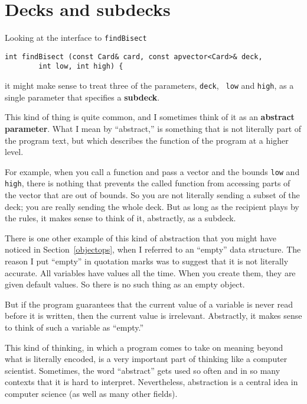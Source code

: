 
\section{Decks and subdecks}

Looking at the interface to {\tt findBisect}

\begin{verbatim}
int findBisect (const Card& card, const apvector<Card>& deck,
		int low, int high) {
\end{verbatim}
%
it might make sense to treat three of the parameters, {\tt deck}, {\tt
low} and {\tt high}, as a single parameter that specifies a {\bf
subdeck}.


This kind of thing is quite common, and I sometimes think of it as an
{\bf abstract parameter}.  What I mean by ``abstract,'' is something
that is not literally part of the program text, but which describes the
function of the program at a higher level.

For example, when you call a function and pass a vector and the bounds
{\tt low} and {\tt high}, there is nothing that prevents the called
function from accessing parts of the vector that are out of bounds.  So
you are not literally sending a subset of the deck; you are really
sending the whole deck.  But as long as the recipient plays by the
rules, it makes sense to think of it, abstractly, as a subdeck.

There is one other example of this kind of abstraction that you might
have noticed in Section~\ref{objectops}, when I referred to an
``empty'' data structure.  The reason I put ``empty'' in quotation
marks was to suggest that it is not literally accurate.  All variables
have values all the time.  When you create them, they are given
default values.  So there is no such thing as an empty object.

But if the program guarantees that the current value of a variable is
never read before it is written, then the current value is irrelevant.
Abstractly, it makes sense to think of such a variable as ``empty.''

This kind of thinking, in which a program comes to take on meaning
beyond what is literally encoded, is a very important part of thinking
like a computer scientist.  Sometimes, the word ``abstract'' gets used
so often and in so many contexts that it is hard to interpret.
Nevertheless, abstraction is a central idea in computer science (as
well as many other fields).

